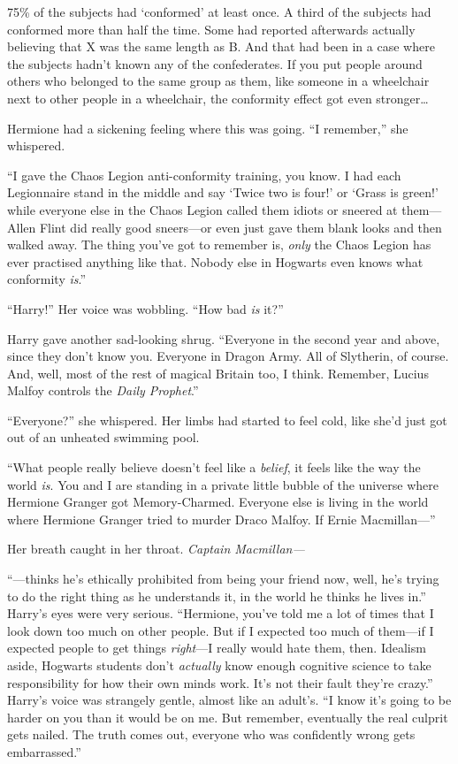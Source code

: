 75\% of the subjects had ‘conformed’ at least once. A third of the subjects had conformed more than half the time. Some had reported afterwards actually believing that X was the same length as B\@. And that had been in a case where the subjects hadn’t known any of the confederates. If you put people around others who belonged to the same group as them, like someone in a wheelchair next to other people in a wheelchair, the conformity effect got even stronger…

Hermione had a sickening feeling where this was going. “I remember,” she whispered.

“I gave the Chaos Legion anti-conformity training, you know. I had each Legionnaire stand in the middle and say ‘Twice two is four!’ or ‘Grass is green!’ while everyone else in the Chaos Legion called them idiots or sneered at them—Allen Flint did really good sneers—or even just gave them blank looks and then walked away. The thing you’ve got to remember is, \emph{only} the Chaos Legion has ever practised anything like that. Nobody else in Hogwarts even knows what conformity \emph{is}.”

“Harry!” Her voice was wobbling. “How bad \emph{is} it?”

Harry gave another sad-looking shrug. “Everyone in the second year and above, since they don’t know you. Everyone in Dragon Army. All of Slytherin, of course. And, well, most of the rest of magical Britain too, I think. Remember, Lucius Malfoy controls the \emph{Daily Prophet}.”

“Everyone?” she whispered. Her limbs had started to feel cold, like she’d just got out of an unheated swimming pool.

“What people really believe doesn’t feel like a \emph{belief}, it feels like the way the world \emph{is}. You and I are standing in a private little bubble of the universe where Hermione Granger got Memory-Charmed. Everyone else is living in the world where Hermione Granger tried to murder Draco Malfoy. If Ernie Macmillan—”

Her breath caught in her throat. \emph{Captain Macmillan—}

“—thinks he’s ethically prohibited from being your friend now, well, he’s trying to do the right thing as he understands it, in the world he thinks he lives in.” Harry’s eyes were very serious. “Hermione, you’ve told me a lot of times that I look down too much on other people. But if I expected too much of them—if I expected people to get things \emph{right}—I really would hate them, then. Idealism aside, Hogwarts students don’t \emph{actually} know enough cognitive science to take responsibility for how their own minds work. It’s not their fault they’re crazy.” Harry’s voice was strangely gentle, almost like an adult’s. “I know it’s going to be harder on you than it would be on me. But remember, eventually the real culprit gets nailed. The truth comes out, everyone who was confidently wrong gets embarrassed.”

